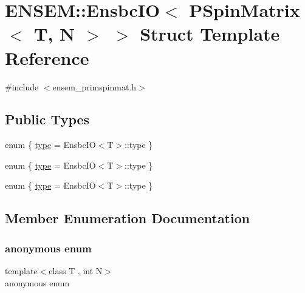 \hypertarget{structENSEM_1_1EnsbcIO_3_01PSpinMatrix_3_01T_00_01N_01_4_01_4}{}\section{E\+N\+S\+EM\+:\+:Ensbc\+IO$<$ P\+Spin\+Matrix$<$ T, N $>$ $>$ Struct Template Reference}
\label{structENSEM_1_1EnsbcIO_3_01PSpinMatrix_3_01T_00_01N_01_4_01_4}


{\ttfamily \#include $<$ensem\+\_\+primspinmat.\+h$>$}

\subsection*{Public Types}
\begin{DoxyCompactItemize}
\item 
enum \{ \mbox{\hyperlink{structENSEM_1_1EnsbcIO_3_01PSpinMatrix_3_01T_00_01N_01_4_01_4_a110c5f1d09e2b2f6558f5fc6979b8f13af077b5478aa428f9a9b3c64cb72e8a8c}{type}} = Ensbc\+IO$<$T$>$\+:\+:type
 \}
\item 
enum \{ \mbox{\hyperlink{structENSEM_1_1EnsbcIO_3_01PSpinMatrix_3_01T_00_01N_01_4_01_4_a110c5f1d09e2b2f6558f5fc6979b8f13af077b5478aa428f9a9b3c64cb72e8a8c}{type}} = Ensbc\+IO$<$T$>$\+:\+:type
 \}
\item 
enum \{ \mbox{\hyperlink{structENSEM_1_1EnsbcIO_3_01PSpinMatrix_3_01T_00_01N_01_4_01_4_a110c5f1d09e2b2f6558f5fc6979b8f13af077b5478aa428f9a9b3c64cb72e8a8c}{type}} = Ensbc\+IO$<$T$>$\+:\+:type
 \}
\end{DoxyCompactItemize}


\subsection{Member Enumeration Documentation}
\mbox{\label{structENSEM_1_1EnsbcIO_3_01PSpinMatrix_3_01T_00_01N_01_4_01_4_ac4138d959d9dfe07b7e4b78aa7cc52dc}} 
\subsubsection{\texorpdfstring{anonymous enum}{anonymous enum}}
{\footnotesize\ttfamily template$<$class T , int N$>$ \\
anonymous enum}

